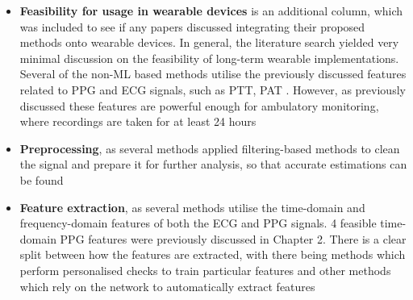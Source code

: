 \begin{itemize}
    \item \textbf{Feasibility for usage in wearable devices} is an additional column, which was included to see if any papers discussed integrating their proposed methods onto wearable devices. In general, the literature search yielded very minimal discussion on the feasibility of long-term wearable implementations. Several of the non-ML based methods utilise the previously discussed features related to PPG and ECG signals, such as PTT, PAT \cite{Ding2016} \cite{Ahmad2012} \cite{Yamanaka2016}. However, as previously discussed these features are powerful enough for ambulatory monitoring, where recordings are taken for at least 24 hours
    \item \textbf{Preprocessing}, as several methods applied filtering-based methods to clean the signal and prepare it for further analysis, so that accurate estimations can be found
    \item  \textbf{Feature extraction}, as several methods utilise the time-domain and frequency-domain features of both the ECG and PPG signals. 4 feasible time-domain PPG features were previously discussed in Chapter 2. There is a clear split between how the features are extracted, with there being methods which perform personalised checks to train particular features and other methods which rely on the network to automatically extract features 
\end{itemize}

